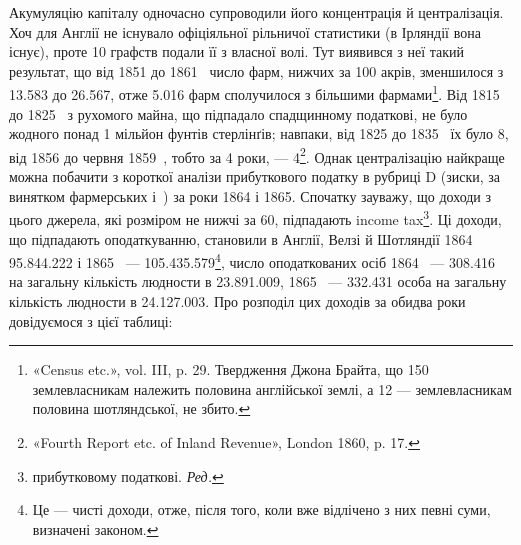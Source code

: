 Акумуляцію капіталу одночасно супроводили його концентрація
й централізація. Хоч для Англії не існувало офіціяльної
рільничої статистики (в Ірляндії вона існує), проте 10 графств подали
її з власної волі. Тут виявився з неї такий результат, що від
1851 до 1861~ число фарм, нижчих за 100 акрів, зменшилося з
\num{13.583} до \num{26.567}, отже \num{5.016} фарм сполучилося з більшими фармами\footnote{
«Census etc.», vol. III, p. 29. Твердження Джона Брайта, що 150
землевласникам належить половина англійської землі, а 12 — землевласникам
половина шотляндської, не збито.
}.  Від 1815 до 1825~ з рухомого майна, що підпадало спадщинному
податкові, не було жодного понад 1 мільйон фунтів стерлінґів;
навпаки, від 1825 до 1835~ їх було 8, від 1856 до червня
1859~, тобто за 4 роки, — 4\footnote{
«Fourth Report etc. of Inland Revenue», London 1860, p. 17.
}. Однак централізацію найкраще
можна побачити з короткої аналізи прибуткового податку
в рубриці D (зиски, за винятком фармерських і~) за роки
1864 і 1865. Спочатку зауважу, що доходи з цього джерела,
які розміром не нижчі за 60, підпадають
income tax\footnote*{
прибутковому податкові. \emph{Ред.}
}. Ці доходи, що підпадають оподаткуванню, становили
в Англії, Велзі й Шотляндії 1864~ \num{95.844.222}
і 1865~ — \num{105.435.579}\footnote{
Це — чисті доходи, отже, після того, коли вже відлічено з них
певні суми, визначені законом.
}, число оподаткованих
осіб 1864~ — \num{308.416} на загальну кількість людности в
\num{23.891.009}, 1865~ — \num{332.431} особа на загальну кількість людности
в \num{24.127.003}. Про розподіл цих доходів за обидва роки
довідуємося з цієї таблиці:

